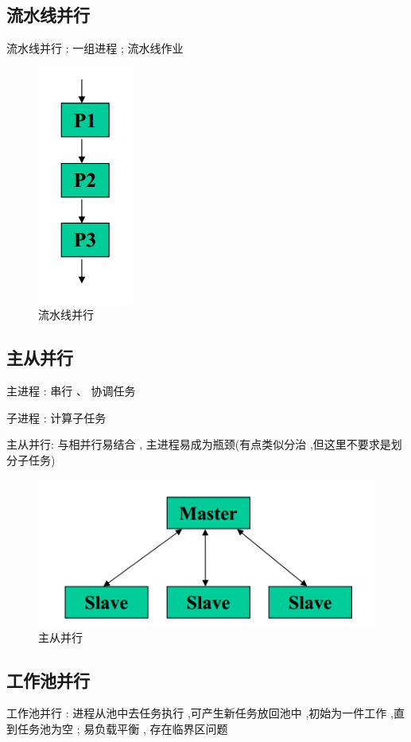 \documentclass[UTF8,a4paper]{ctexart}
\begin{document}
\subsection{流水线并行}
流水线并行 : 一组进程 ; 流水线作业
\begin{figure}[H]
  \centering
  \includegraphics[scale = 0.3]{assets/ParallelComputing_34d57.png}
  \caption{流水线并行}
\end{figure}

\subsection{主从并行}
主进程 : 串行 、 协调任务

子进程 : 计算子任务

主从并行: 与相并行易结合 , 主进程易成为瓶颈(有点类似分治 ,但这里不要求是划分子任务)

\begin{figure}[H]
  \centering
  \includegraphics[scale = 0.3]{assets/ParallelComputing_703c4.png}
  \caption{主从并行}
\end{figure}

\subsection{工作池并行}
工作池并行 : 进程从池中去任务执行 ,可产生新任务放回池中 ,初始为一件工作 ,直到任务池为空 ; 易负载平衡 , 存在临界区问题
\end{document}
